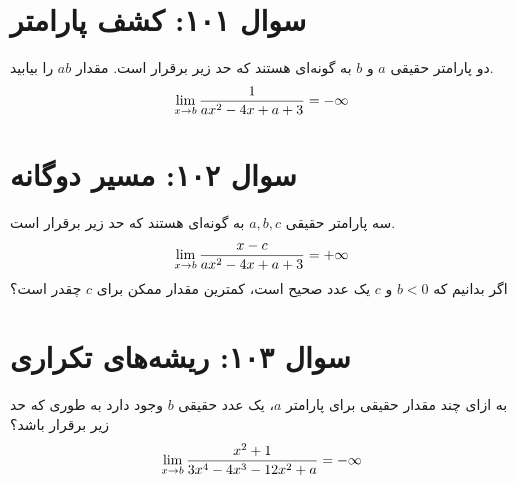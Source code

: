 \documentclass[12pt]{article}
\begin{document}
\vspace{1cm}
\hrulefill
\vspace{1cm}


\section*{سوال ۱۰۱: کشف پارامتر}
دو پارامتر حقیقی \(a\) و \(b\) به گونه‌ای هستند که حد زیر برقرار است. مقدار \(ab\) را بیابید.
\begin{displaymath}
	\Large \lim_{x \to b} \frac{1}{ax^2 - 4x + a + 3} = -\infty
\end{displaymath}

\vspace{1cm}
\hrulefill
\vspace{1cm}

\section*{سوال ۱۰۲: مسیر دوگانه}
سه پارامتر حقیقی \(a, b, c\) به گونه‌ای هستند که حد زیر برقرار است.
\begin{displaymath}
	\Large \lim_{x \to b} \frac{x-c}{ax^2 - 4x + a + 3} = +\infty
\end{displaymath}
اگر بدانیم که \(b < 0\) و \(c\) یک عدد صحیح است، کمترین مقدار ممکن برای \(c\) چقدر است؟

\vspace{1cm}
\hrulefill
\vspace{1cm}

\section*{سوال ۱۰۳: ریشه‌های تکراری}
به ازای چند مقدار حقیقی برای پارامتر \(a\)، یک عدد حقیقی \(b\) وجود دارد به طوری که حد زیر برقرار باشد؟
\begin{displaymath}
	\Large \lim_{x \to b} \frac{x^2+1}{3x^4 - 4x^3 - 12x^2 + a} = -\infty
\end{displaymath}
\end{document}
